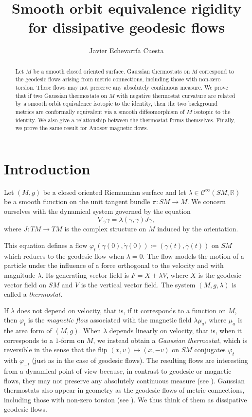 \documentclass[reqno,12pt,letterpaper]{amsart}
\title[Smooth orbit equivalence rigidity for dissipative geodesic flows]{Smooth orbit equivalence rigidity for dissipative geodesic flows}
\author[J.~Echevarría Cuesta]{Javier {Echevarría Cuesta}}
\theoremstyle{definition}
\theoremstyle{remark}
\theoremstyle{definition}
\numberwithin{equation}{section}
\newcommand{\R}{\mathbb{R}}
\begin{document}
\begin{abstract}
Let $M$ be a smooth closed oriented surface. Gaussian thermostats on $M$ correspond to the geodesic flows arising from metric connections, including those with non-zero torsion. These flows may not preserve any absolutely continuous measure. We prove that if two Gaussian  thermostats on $M$ with negative thermostat curvature are related by a smooth orbit equivalence isotopic to the identity, then the two background metrics are conformally equivalent via a smooth diffeomorphism of $M$ isotopic to the identity. We also give a relationship between the thermostat forms themselves. Finally, we prove the same result for Anosov magnetic flows.
\end{abstract}
\maketitle

\section{Introduction}
Let $(M,g)$ be a closed oriented Riemannian surface and let $\lambda\in \mathcal{C}^\infty(SM,\R)$ be a smooth function on the unit tangent bundle $\pi: SM\to M$.  We concern ourselves with the dynamical system governed by the equation 
\begin{equation*}%
\nabla_{\dot{\gamma}}\dot{\gamma}=\lambda(\gamma, \dot{\gamma})J\dot{\gamma},
\end{equation*}
where $J:TM\to TM$ is the complex structure on $M$ induced by the orientation.

This equation defines a flow $\varphi_t(\gamma(0),\dot{\gamma}(0))\coloneqq(\gamma(t), \dot{\gamma}(t))$ on $SM$ which reduces to the geodesic flow when $\lambda=0$. The flow models the motion of a particle under the influence of a force orthogonal to the velocity and with magnitude $\lambda$. Its generating vector field is $F=X+\lambda V$, where $X$ is the geodesic vector field on $SM$ and $V$ is the vertical vector field. The system $(M, g, \lambda)$ is called a \textit{thermostat}. 

If $\lambda$ does not depend on velocity, that is, if it corresponds to a function on $M$, then $\varphi_t$ is the \textit{magnetic flow} associated with the magnetic field $\lambda \mu_a$, where  $\mu_a$ is the area form of $(M,g)$. When $\lambda$ depends linearly on velocity, that is, when it corresponds to a $1$-form on $M$, we instead obtain a \textit{Gaussian thermostat}, which is reversible in the sense that the flip $(x,v)\mapsto (x, -v)$ on $SM$ conjugates $\varphi_t$ with $\varphi_{-t}$ (just as in the case of geodesic flows). The resulting flows are interesting from a dynamical point of view because, in contrast to geodesic or magnetic flows, they may not preserve any absolutely continuous measure (see \cite{dairbekov07}). Gaussian thermostats also appear in geometry as the geodesic flows of metric connections, including those with non-zero torsion (see \cite{przytycki08}). We thus think of them as dissipative geodesic flows. 
\end{document}
